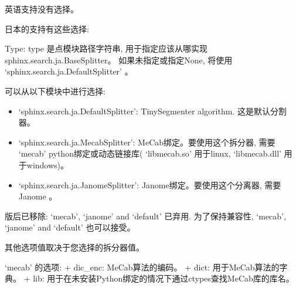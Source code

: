 \documentclass[a4paper,10pt,english]{sphinxmanual}
\begin{document}
\sphinxAtStartPar
英语支持没有选择。

\sphinxAtStartPar
日本的支持有这些选择:

\sphinxAtStartPar
Type: type 是点模块路径字符串, 用于指定应该从哪实现 sphinx.search.ja.BaseSplitter。
如果未指定或指定None, 将使用 ‘sphinx.search.ja.DefaultSplitter’ 。

\sphinxAtStartPar
可以从以下模块中进行选择:
\begin{itemize}
\item {} 
\sphinxAtStartPar
‘sphinx.search.ja.DefaultSplitter’: TinySegmenter algorithm. 这是默认分割器。

\item {} 
\sphinxAtStartPar
‘sphinx.search.ja.MecabSplitter’: MeCab绑定。要使用这个拆分器, 需要 ‘mecab’ python绑定或动态链接库( ‘libmecab.so’ 用于linux, ‘libmecab.dll’ 用于windows)。

\item {} 
\sphinxAtStartPar
‘sphinx.search.ja.JanomeSplitter’: Janome绑定。要使用这个分离器, 需要 Janome 。

\end{itemize}

 版后已移除: ‘mecab’, ‘janome’ and ‘default’ 已弃用. 为了保持兼容性, ‘mecab’, ‘janome’ and ‘default’ 也可以接受。

\sphinxAtStartPar
其他选项值取决于您选择的拆分器值。

\sphinxAtStartPar
‘mecab’ 的选项:
+ dic\_enc: MeCab算法的编码。
+ dict: 用于MeCab算法的字典。
+ lib: 用于在未安装Python绑定的情况下通过ctypes查找MeCab库的库名。

\begin{sphinxVerbatim}[commandchars=\\\{\}]
  
 
 
 
 
\end{sphinxVerbatim}
\end{document}
